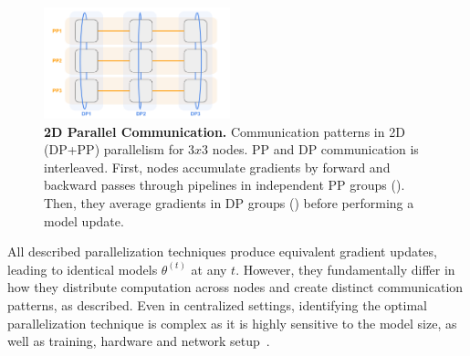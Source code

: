 \documentclass{article}
\newcommand{\orangebox}{\tcbox[size=minimal,boxrule=0pt,arc=3pt,
  colback=oorange!50,colframe=oorange!50,left=1pt,right=1pt,top=1pt,bottom=1pt]{\phantom{x}}}
\newcommand{\bluebox}{\tcbox[size=minimal,boxrule=0pt,arc=3pt,
  colback=bblue!50,colframe=bblue!50,left=1pt,right=1pt,top=1pt,bottom=1pt]{\phantom{x}}}
\begin{document}
\begin{figure}[ht]
    \centering
    \includegraphics[width=0.48\textwidth]{figures/dp-pp.png}
    \caption{\textbf{2D Parallel Communication.} Communication patterns in 2D
    (DP+PP) parallelism for $3x3$ nodes. PP and DP communication is interleaved.
    First, nodes accumulate gradients by forward and backward passes through
    pipelines in independent PP groups (\mbox{\orangebox}). Then,
    they average gradients in DP groups (\mbox{\bluebox}) before
    performing a model update.  }
    \label{fig:dp-pp}
\end{figure}

All described parallelization techniques produce equivalent gradient updates,
leading to identical models $\theta^{(t)}$ at any $t$. However, they
fundamentally differ in how they distribute computation across nodes and create
distinct communication patterns, as described. Even in centralized settings,
identifying the optimal parallelization technique is complex as it is highly
sensitive to the model size, as well as training, hardware and network
setup~\cite{hagemann2024parallelization, fernandez2024scalingtrends}.

% 
% 
% 
\end{document}
